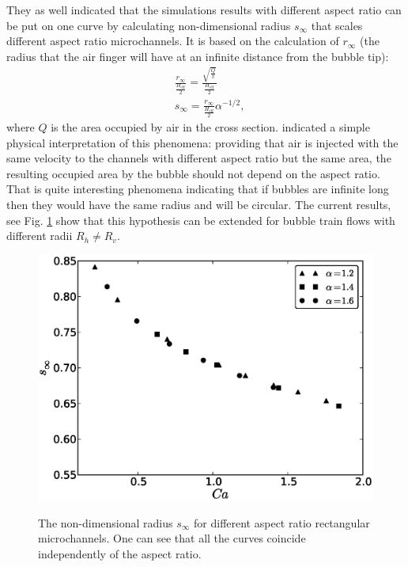 \documentclass[preprint,12pt]{elsarticle}
\begin{document}
They as well indicated that the simulations results with different aspect ratio can be
put on one curve by calculating non-dimensional radius $s_{\infty}$ that scales different aspect
ratio microchannels. It is based on the calculation of  $r_{\infty}$ (the radius that the air
finger will have at an infinite distance from the bubble tip):
\begin{equation}
\begin{aligned}
&\frac{r_{\infty}}{\frac{H_{\mathrm{eff}}}{2}}=\frac{\sqrt{\frac{Q}{\pi}}}{\frac{H_{\mathrm{eff}}}{2
} }\\
&s_{\infty}=\frac{r_{\infty}}{\frac{H_{\mathrm{eff}}}{2}}\alpha^{-1/2},
\end{aligned}
\end{equation}
where $Q$ is the area occupied by air in the cross section. \citet{heil-threedim} indicated a simple
physical interpretation of this phenomena:  providing that air is injected with the same
velocity to the channels with different aspect ratio but the same area, the resulting occupied area by the bubble
should not depend on the aspect ratio. That is quite interesting phenomena indicating that if bubbles are infinite long then they would have the same radius and will be circular. The current results, see Fig. \ref{fig:one:curve} show that
this hypothesis can be extended for bubble train flows with different radii $R_h \neq R_v$. 
\begin{figure}[htb!]
\includegraphics[width=\textwidth]{Figures/onecurve.eps}\\
\caption{The non-dimensional radius $s_{\infty}$ for different aspect ratio
rectangular microchannels. One can see that all the curves coincide
independently of the aspect ratio.\label{fig:one:curve}}
\end{figure}
\end{document}
